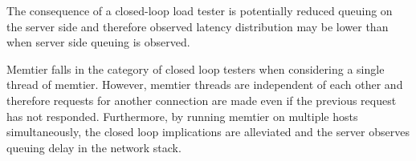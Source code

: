 The consequence of a closed-loop load tester is potentially reduced queuing on the server side and therefore observed latency distribution may be lower than when server side queuing is observed.

Memtier falls in the category of closed loop testers when considering a single thread of memtier. However, memtier threads are independent of each other and therefore requests for another connection are made even if the previous request has not responded. Furthermore, by running memtier on multiple hosts simultaneously, the closed loop implications are alleviated and the server observes queuing delay in the network stack.
